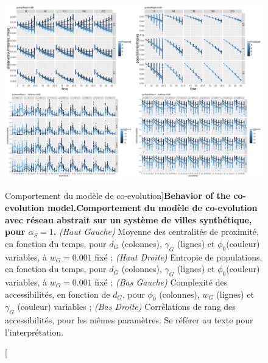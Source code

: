 \begin{figure}
\includegraphics[width=\linewidth]{Figures/Final/6-2-2-fig-macrocoevol-behavior.jpg}
\caption[Behavior of the co-evolution model][Comportement du modèle de co-evolution]{\textbf{Behavior of the co-evolution model.}\label{fig:macrocoevol:behavior}}{\textbf{Comportement du modèle de co-evolution avec réseau abstrait sur un système de villes synthétique, pour $\alpha_S = 1$.} \textit{(Haut Gauche)} Moyenne des centralités de proximité, en fonction du temps, pour $d_G$ (colonnes), $\gamma_G$ (lignes) et $\phi_0$(couleur) variables, à $w_G = 0.001$ fixé ; \textit{(Haut Droite)} Entropie de populations, en fonction du temps, pour $d_G$ (colonnes), $\gamma_G$ (lignes) et $\phi_0$(couleur) variables, à $w_G = 0.001$ fixé ; \textit{(Bas Gauche)} Complexité des accessibilités, en fonction de $d_G$, pour $\phi_0$ (colonnes), $w_G$ (lignes) et $\gamma_G$ (couleur) variables ; \textit{(Bas Droite)} Corrélations de rang des accessibilités, pour les mêmes paramètres. Se référer au texte pour l'interprétation.\comment[FL]{()}\label{fig:macrocoevol:behavior}}
\end{figure}




